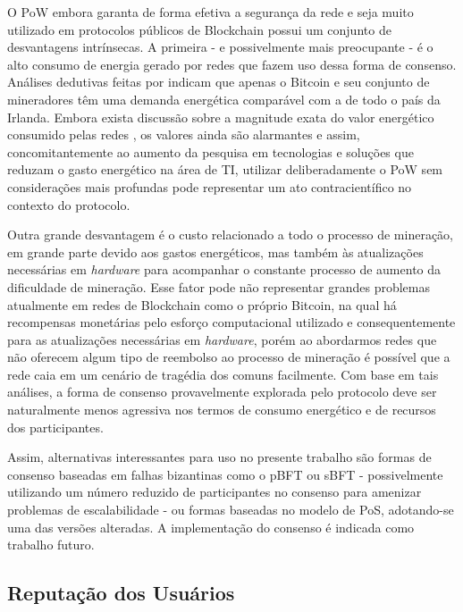 %
O \ac{PoW} embora garanta de forma efetiva a segurança da rede e seja muito utilizado em protocolos públicos de Blockchain possui um conjunto de desvantagens intrínsecas. A primeira - e possivelmente mais preocupante - é o alto consumo de energia gerado por redes que fazem uso dessa forma de consenso. Análises dedutivas feitas por  indicam que apenas o Bitcoin e seu conjunto de mineradores têm uma demanda energética comparável com a de todo o país da Irlanda.
%
Embora exista discussão sobre a magnitude exata do valor energético consumido pelas redes \cite{blockchain:contraponto_energia}, os valores ainda são alarmantes e assim, concomitantemente ao aumento da pesquisa em tecnologias e soluções que reduzam o gasto energético na área de TI, utilizar deliberadamente o \ac{PoW} sem considerações mais profundas pode representar um ato contracientífico no contexto do protocolo.

%
Outra grande desvantagem é o custo relacionado a todo o processo de mineração, em grande parte devido aos gastos energéticos, mas também às atualizações necessárias em \textit{hardware} para acompanhar o constante processo de aumento da dificuldade de mineração. Esse fator pode não representar grandes problemas atualmente em redes de Blockchain como o próprio Bitcoin, na qual há recompensas monetárias pelo esforço computacional utilizado e consequentemente para as atualizações necessárias em \textit{hardware}, porém ao abordarmos redes que não oferecem algum tipo de reembolso ao processo de mineração é possível que a rede caia em um cenário de tragédia dos comuns facilmente. 
%
Com base em tais análises, a forma de consenso provavelmente explorada pelo protocolo deve ser naturalmente menos agressiva nos termos de consumo energético e de recursos dos participantes.

%
Assim, alternativas interessantes para uso no presente trabalho são formas de consenso baseadas em falhas bizantinas como o \ac{pBFT} ou sBFT - possivelmente utilizando um número reduzido de participantes no consenso para amenizar problemas de escalabilidade - ou formas baseadas no modelo de \ac{PoS}, adotando-se uma das versões alteradas.
A implementação do consenso é indicada como trabalho futuro.

\subsection{Reputação dos Usuários}


